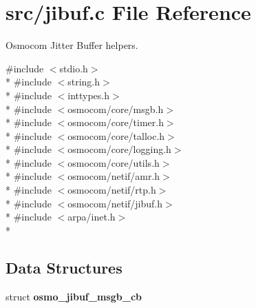 \section{src/jibuf.c File Reference}
\label{jibuf_8c}


Osmocom Jitter Buffer helpers.  


{\ttfamily \#include $<$stdio.\+h$>$}\\*
{\ttfamily \#include $<$string.\+h$>$}\\*
{\ttfamily \#include $<$inttypes.\+h$>$}\\*
{\ttfamily \#include $<$osmocom/core/msgb.\+h$>$}\\*
{\ttfamily \#include $<$osmocom/core/timer.\+h$>$}\\*
{\ttfamily \#include $<$osmocom/core/talloc.\+h$>$}\\*
{\ttfamily \#include $<$osmocom/core/logging.\+h$>$}\\*
{\ttfamily \#include $<$osmocom/core/utils.\+h$>$}\\*
{\ttfamily \#include $<$osmocom/netif/amr.\+h$>$}\\*
{\ttfamily \#include $<$osmocom/netif/rtp.\+h$>$}\\*
{\ttfamily \#include $<$osmocom/netif/jibuf.\+h$>$}\\*
{\ttfamily \#include $<$arpa/inet.\+h$>$}\\*
\subsection*{Data Structures}
\begin{DoxyCompactItemize}
\item 
struct {\bf osmo\+\_\+jibuf\+\_\+msgb\+\_\+cb}
\end{DoxyCompactItemize}
